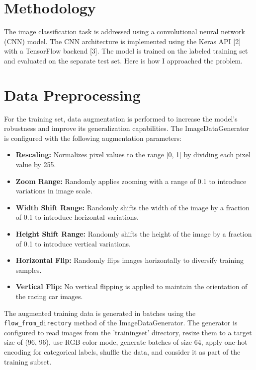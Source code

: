 \documentclass{article}
\begin{document}
\section{Methodology}

The image classification task is addressed using a convolutional neural network (CNN) model. The CNN architecture is implemented using the Keras API [2] with a TensorFlow backend [3]. The model is trained on the labeled training set and evaluated on the separate test set.
\newline
\newline
Here is how I approached the problem.

\section{Data Preprocessing}

For the training set, data augmentation is performed to increase the model's robustness and improve its generalization capabilities. The ImageDataGenerator is configured with the following augmentation parameters:

\begin{itemize}
    \item \textbf{Rescaling:} Normalizes pixel values to the range [0, 1] by dividing each pixel value by 255.
    \item \textbf{Zoom Range:} Randomly applies zooming with a range of 0.1 to introduce variations in image scale.
    \item \textbf{Width Shift Range:} Randomly shifts the width of the image by a fraction of 0.1 to introduce horizontal variations.
    \item \textbf{Height Shift Range:} Randomly shifts the height of the image by a fraction of 0.1 to introduce vertical variations.
    \item \textbf{Horizontal Flip:} Randomly flips images horizontally to diversify training samples.
    \item \textbf{Vertical Flip:} No vertical flipping is applied to maintain the orientation of the racing car images.
\end{itemize}

The augmented training data is generated in batches using the \texttt{flow\_from\_directory} method of the ImageDataGenerator. The generator is configured to read images from the 'trainingset' directory, resize them to a target size of (96, 96), use RGB color mode, generate batches of size 64, apply one-hot encoding for categorical labels, shuffle the data, and consider it as part of the training subset.
\end{document}
